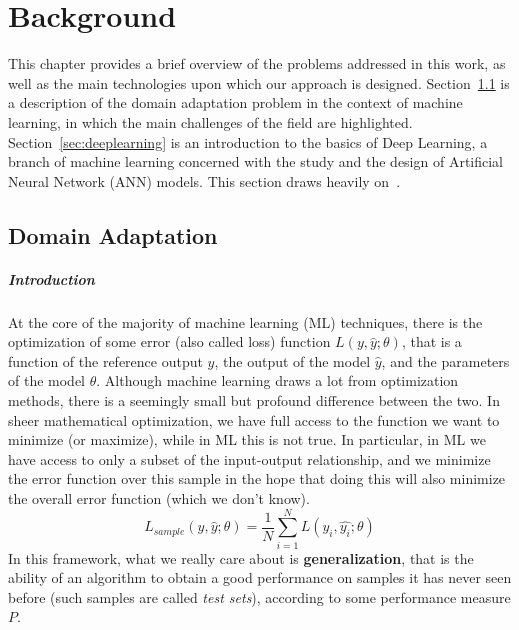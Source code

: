 \documentclass[../main.tex]{subfiles}
\begin{document}
    \chapter{Background}\label{chap:background}

    This chapter provides a brief overview of the problems addressed in this work, as well as the main
    technologies upon which our approach is designed.
    Section~\ref{sec:domainadapt} is a description of the domain adaptation problem in the context
    of machine learning, in which the main challenges of the field are highlighted.
    Section~\ref{sec:deeplearning} is an introduction to the basics of Deep Learning,
    a branch of machine learning concerned with the study and the design of Artificial Neural Network (ANN) models.
    This section draws heavily on~\cite{Goodfellow-et-al-2016}.

    \section{Domain Adaptation}\label{sec:domainadapt}

    \paragraph{Introduction}
    At the core of the majority of machine learning (ML) techniques, there is the optimization of some
    error (also called loss) function $L(y, \hat{y}; \theta)$, that is a function of the reference output $y$, the output
    of the model $\hat{y}$, and the parameters of the model $\theta$.
    \newline
    Although machine learning draws a lot from optimization methods, there is a seemingly small but profound difference
    between the two. In sheer mathematical optimization, we have full access to the function we want to minimize (or maximize),
    while in ML this is not true. In particular, in ML we have access to only a subset of the input-output relationship,
    and we minimize the error function over this sample in the hope that doing this will also minimize the overall error function
    (which we don't know).
    $$ L_{sample}(y, \hat{y}; \theta) = \frac{1}{N} \sum_{i = 1}^{N} L(y_{i}, \hat{y_{i}}; \theta) $$
    In this framework, what we really care about is \textbf{generalization}, that is the ability of an algorithm to obtain a good
    performance on samples it has never seen before (such samples are called \textit{test sets}), according to some performance measure $P$.
\end{document}

